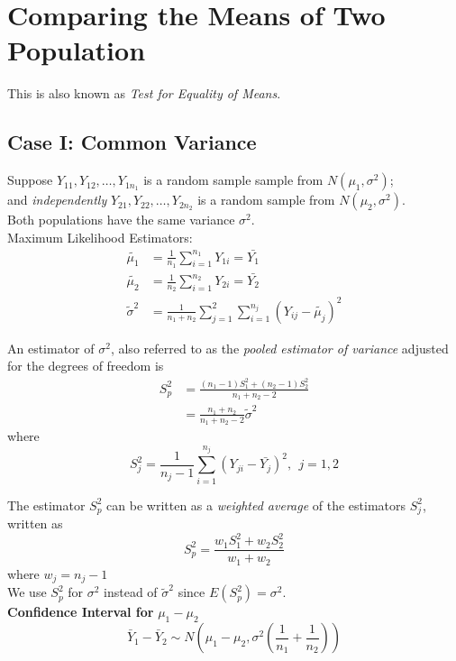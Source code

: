 \documentclass[12pt]{article}
\theoremstyle{definition}
\begin{document}
  \newpage
  \section{Comparing the Means of Two Population}
  This is also known as \emph{Test for Equality of Means}.
  \subsection{Case I: Common Variance}
  Suppose $Y_{11}, Y_{12}, \dots, Y_{1n_{1}}$ is a random sample sample from $N(\mu_{1}, \sigma^2)$; \\
  and \emph{independently} $Y_{21}, Y_{22}, \dots, Y_{2n_{2}}$ is a random sample from $N(\mu_{2}, \sigma^2)$. \\

  Both populations have the same variance $\sigma^2$. \\

  Maximum Likelihood Estimators:
  \begin{align*}
    \widetilde{\mu_{1}} &= \frac{1}{n_{1}}\sum_{i=1}^{n_{1}}Y_{1i} = \bar{Y_{1}} \\
    \widetilde{\mu_{2}} &= \frac{1}{n_{2}}\sum_{i=1}^{n_{2}}Y_{2i} = \bar{Y_{2}} \\
    \widetilde{\sigma}^{2} &=
    \frac{1}{n_{1} + n_{2}}\sum_{j=1}^{2}\sum_{i=1}^{n_{j}}(Y_{ij} - \widetilde{\mu_{j}})^{2}
  \end{align*}

  An estimator of $\sigma^2$, also referred to as the \emph{pooled estimator of variance} adjusted for the degrees of freedom is
  \begin{align*}
    S_{p}^{2} &= \frac{(n_{1} - 1)S_{1}^{2} + (n_{2} - 1)S_{2}^{2}}{n_{1} + n_{2} - 2} \\
    &= \frac{n_{1} + n_{2}}{n_{1} + n_{2} - 2}\widetilde{\sigma}^{2}
  \end{align*}
  where
  $$S_{j}^{2} = \frac{1}{n_{j} - 1}\sum_{i=1}^{n_{j}}(Y_{ji} - \bar{Y_{j}})^{2}, ~~ j = 1,2$$

  The estimator $S_{p}^{2}$ can be written as a \emph{weighted average} of the estimators $S_{j}^{2}$, written as
  $$S_{p}^{2} = \frac{w_{1}S_{1}^{2} + w_{2}S_{2}^{2}}{w_{1} + w_{2}}$$
  where $w_{j} = n_{j} - 1$ \\

  We use $S_{p}^{2}$ for $\sigma^{2}$ instead of $\widetilde{\sigma}^{2}$ since $E(S_{p}^{2}) = \sigma^2$. \\

  \textbf{Confidence Interval for} $\mu_{1} - \mu_{2}$ \\
  $$\bar{Y}_{1} - \bar{Y}_{2} \sim N\left(\mu_{1} - \mu_{2},
  \sigma^{2}\left(\frac{1}{n_{1}} + \frac{1}{n_{2}}\right)\right)$$
\end{document}
